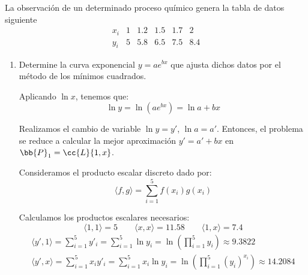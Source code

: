 \begin{ejercicio}
    La observación de un determinado proceso químico genera la tabla de datos siguiente
    \begin{equation*}
        \begin{array}{c|c|c|c|c|c}
            x_i & 1 & 1.2 & 1.5 & 1.7 & 2 \\ \hline
            y_i & 5 & 5.8 & 6.5 & 7.5 & 8.4
        \end{array}
    \end{equation*}

    \begin{enumerate}
        \item Determine la curva exponencial $y = ae^{bx}$ que ajusta dichos datos por el método de los mínimos cuadrados.

        Aplicando $\ln x$, tenemos que:
        \begin{equation*}
            \ln y = \ln (ae^{bx}) = \ln a + bx
        \end{equation*}

        Realizamos el cambio de variable $\ln y = y'$, $\ln a = a'$. Entonces, el problema se reduce a calcular la mejor aproximación $y'=a'+bx$ en $\bb{P}_1=\cc{L}\{1,x\}$.

        Consideramos el producto escalar discreto dado por:
        \begin{equation*}
            \langle f,g\rangle = \sum_{i=1}^5 f(x_i)g(x_i)
        \end{equation*}

        Calculamos los productos escalares necesarios:
        \begin{equation*}
            \langle 1,1\rangle = 5
            \qquad
            \langle x,x\rangle = 11.58
            \qquad
            \langle 1,x\rangle = 7.4
        \end{equation*}
        \begin{gather*}
            \langle y', 1\rangle = \sum_{i=1}^5 y'_i = \sum_{i=1}^5 \ln y_i = \ln\left(\prod_{i=1}^5 y_i\right) \approx 9.3822
            \\
            \langle y',x\rangle = \sum_{i=1}^5 x_iy'_i = \sum_{i=1}^5 x_i\ln y_i = \ln\left(\prod_{i=1}^5 (y_i)^{x_i}\right) \approx 14.2084
        \end{gather*}


\end{enumerate}
\end{ejercicio}
